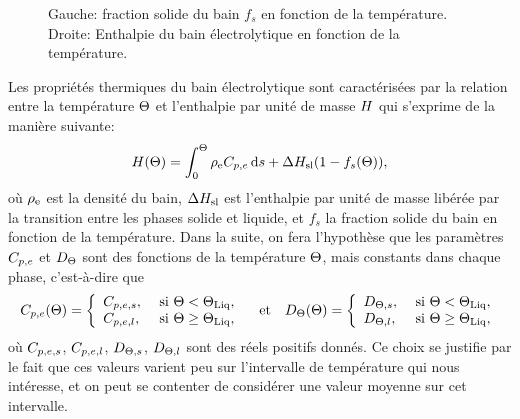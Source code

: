 \begin{figure}
  \begin{center}
    
    
    \caption{Gauche: fraction solide du bain $f_s$ en fonction de la
      température. Droite: Enthalpie du bain électrolytique en
      fonction de la température.}
    \label{fig:solid-fraction-enthalpy}
  \end{center}
\end{figure}

Les propriétés thermiques du bain électrolytique sont
caractérisées par la relation entre la température $\Theta$ et
l'enthalpie par unité de masse $H$ qui s'exprime de la manière
suivante:
\begin{equation}
  \enthalpy(\temperature) = %
    \int_0^\temperature
      \electrolytedensity\electrolytehc\intd{s} %
    + \fusionenthalpy(1 - f_s(\temperature)),
\end{equation}
où $\rho_\mathrm{e}$ est la densité du bain, $\Delta H_\mathrm{sl}$ est
l'enthalpie par unité de masse libérée par la transition entre les
phases solide et liquide, et $f_s$ la fraction solide du bain en
fonction de la température. Dans la suite, on fera l'hypothèse que les
paramètres $C_{p,e}$ et $D_\Theta$ sont des fonctions
de la température $\Theta$, mais constants dans chaque phase,
c'est-à-dire que
\begin{equation}
  C_{p,e}(\Theta) = \left\{
  \begin{array}{ll}
    C_{p,e,s}, & \text{ si } \Theta < \Theta_\text{Liq},\\
    C_{p,e,l}, & \text{ si } \Theta \geq \Theta_\text{Liq},
  \end{array}
  \right.
  \quad\text{et}\quad
  D_\Theta(\Theta) = \left\{
  \begin{array}{ll}
    D_{\Theta,s}, & \text{ si } \Theta < \Theta_\text{Liq},\\
    D_{\Theta,l}, & \text{ si } \Theta \geq \Theta_\text{Liq},
  \end{array}
  \right.
\end{equation}
où $C_{p,e,s}$, $C_{p,e,l}$, $D_{\Theta,s}$,
$D_{\Theta,l}$ sont des réels positifs donnés.
Ce choix se justifie par le fait que ces valeurs
varient peu sur l'intervalle de température qui nous intéresse, et
on peut se contenter de considérer une valeur moyenne sur cet intervalle.

